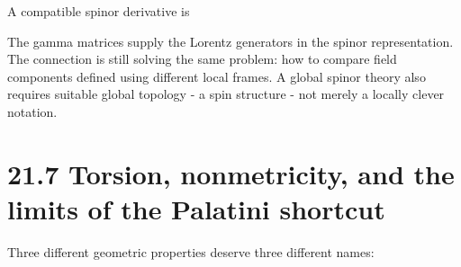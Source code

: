 \documentclass[
  11pt,
  letterpaper,
  oneside,
  openany]{scrbook}
\begin{document}
\begin{center}
\begingroup
{}
\ifdim\wd\grmathbox>\linewidth
\resizebox{\linewidth}{!}{\usebox{\grmathbox}}
\else\usebox{\grmathbox}\fi
\endgroup
\end{center}

A compatible spinor derivative is

\begin{center}
\begingroup
{}
\ifdim\wd\grmathbox>\linewidth
\resizebox{\linewidth}{!}{\usebox{\grmathbox}}
\else\usebox{\grmathbox}\fi
\endgroup
\end{center}

The gamma matrices supply the Lorentz generators in the spinor
representation. The connection is still solving the same problem: how to
compare field components defined using different local frames. A global
spinor theory also requires suitable global topology - a spin structure
- not merely a locally clever notation.

\hypertarget{torsion-nonmetricity-and-the-limits-of-the-palatini-shortcut}{%
\section{21.7 Torsion, nonmetricity, and the limits of the Palatini
shortcut}\label{torsion-nonmetricity-and-the-limits-of-the-palatini-shortcut}}

Three different geometric properties deserve three different names:

\begingroup\small\setlength{\tabcolsep}{5pt}\renewcommand{\arraystretch}{1.13}
\end{document}
